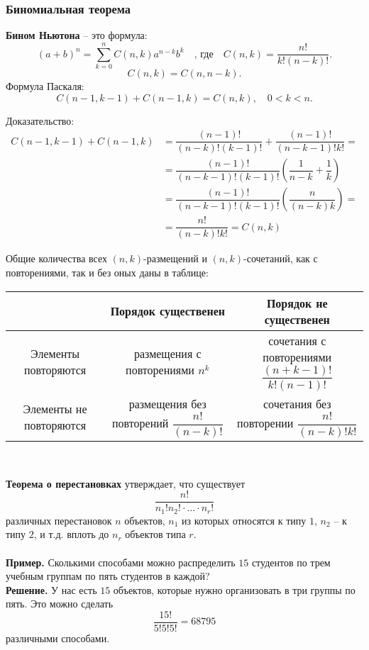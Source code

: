 \subsubsection*{Биномиальная теорема}
\textbf{Бином Ньютона} -- это формула:
\[
(a+b)^n = \sum_{k=0}^{n}
C(n, k) a^{n-k} b^k \quad \text{, где} \quad
C(n, k) = \dfrac{n!}{k! (n-k)!}.
\]
\[
C(n, k) = C(n, n - k).
\]
\indent Формула Паскаля:
\[
C(n-1, k-1) + C(n-1, k) = C(n, k), \quad 0<k<n.
\]
\begin{scriptsize}
\indent Доказательство:
\begin{equation*}
\begin{split}
C(n-1, k-1) + C(n-1, k) &= 
\dfrac{(n-1)!}{(n-k)!(k-1)!} +
\dfrac{(n-1)!}{(n-k-1)! k!} = \\
&= \dfrac{(n-1)!}{(n-k-1)!(k-1)!}
\left( \dfrac{1}{n-k} + \dfrac{1}{k} \right) \\
&= \dfrac{(n-1)!}{(n-k-1)!(k-1)!}
\left( \dfrac{n}{(n-k)k} \right) = \\
&= \dfrac{n!}{(n-k)! k!} = C(n, k)
\end{split}
\end{equation*}
\end{scriptsize}
\indent Общие количества всех $(n, k)$-размещений и $(n, k)$-сочетаний, 
как с повторениями, так и без оных даны в таблице:
\begin{center}
\begin{tabular}{|c|cc|}
\hline
& {\small Порядок существенен} & {\small Порядок не существенен} 
\\
\hline
{\small Элементы повторяются} & 
{\tiny размещения с повторениями} $n^k$ &
{\tiny сочетания с повторениями} $\dfrac{(n+k-1)!}{k!(n-1)!}$
\\
{\small Элементы не повторяются} &
{\tiny размещения без повторений}
$\dfrac{n!}{(n-k)!}$ &
{\tiny сочетания без повторении}
$\dfrac{n!}{(n-k)!k!}$ \\
\hline
\end{tabular} \\
\end{center}
\indent \textbf{Теорема о перестановках} утверждает, что существует
\[
\dfrac{n!}{n_1!n_2! \cdot \ldots \cdot n_r!}
\]
различных перестановок $n$ объектов, $n_1$ из которых относятся 
к типу $1$, $n_2$ -- к типу $2$, и т.д. вплоть до 
$n_r$ объектов типа $r$. \\ \\ \indent
\textbf{Пример.} Сколькими способами можно распределить 
$15$ студен­тов по трем учебным группам по пять студентов в каждой?
\\ \indent
\textbf{Решение.} У нас есть $15$ объектов, 
которые нужно организовать в три группы по пять. 
Это можно сделать
\[
\dfrac{15!}{5!5!5!} = 68795
\]
различными способами.
\newpage
